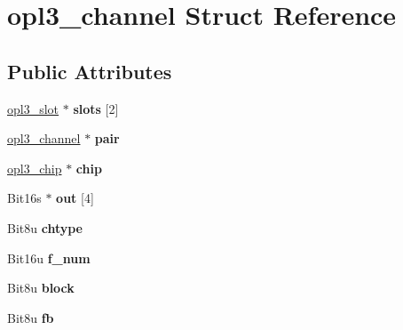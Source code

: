 \hypertarget{structopl3__channel}{\section{opl3\-\_\-channel Struct Reference}
\label{structopl3__channel}
}
\subsection*{Public Attributes}
\begin{DoxyCompactItemize}
\item 
\hypertarget{structopl3__channel_a1a6afe91e5977ae593d680159b65080d}{\hyperlink{structopl3__slot}{opl3\-\_\-slot} $\ast$ {\bfseries slots} \mbox{[}2\mbox{]}}\label{structopl3__channel_a1a6afe91e5977ae593d680159b65080d}

\item 
\hypertarget{structopl3__channel_a7f335b0a5ec1081c20623ccf09dd8d62}{\hyperlink{structopl3__channel}{opl3\-\_\-channel} $\ast$ {\bfseries pair}}\label{structopl3__channel_a7f335b0a5ec1081c20623ccf09dd8d62}

\item 
\hypertarget{structopl3__channel_a9c1e8d9aaeaad91b0e7436e770f42f63}{\hyperlink{structopl3__chip}{opl3\-\_\-chip} $\ast$ {\bfseries chip}}\label{structopl3__channel_a9c1e8d9aaeaad91b0e7436e770f42f63}

\item 
\hypertarget{structopl3__channel_a7e55c6be567c8248f77e8bc5adb48542}{Bit16s $\ast$ {\bfseries out} \mbox{[}4\mbox{]}}\label{structopl3__channel_a7e55c6be567c8248f77e8bc5adb48542}

\item 
\hypertarget{structopl3__channel_aee5bca4833566cb88370c0bd0d01841f}{Bit8u {\bfseries chtype}}\label{structopl3__channel_aee5bca4833566cb88370c0bd0d01841f}

\item 
\hypertarget{structopl3__channel_ad7a623acb4941fb77e3991c6ffe55067}{Bit16u {\bfseries f\-\_\-num}}\label{structopl3__channel_ad7a623acb4941fb77e3991c6ffe55067}

\item 
\hypertarget{structopl3__channel_a89782385e0242b4ce01f66d89210ca1f}{Bit8u {\bfseries block}}\label{structopl3__channel_a89782385e0242b4ce01f66d89210ca1f}

\item 
\hypertarget{structopl3__channel_a573adbf6f392748c0910c826868f4bce}{Bit8u {\bfseries fb}}\label{structopl3__channel_a573adbf6f392748c0910c826868f4bce}


\end{DoxyCompactItemize}
